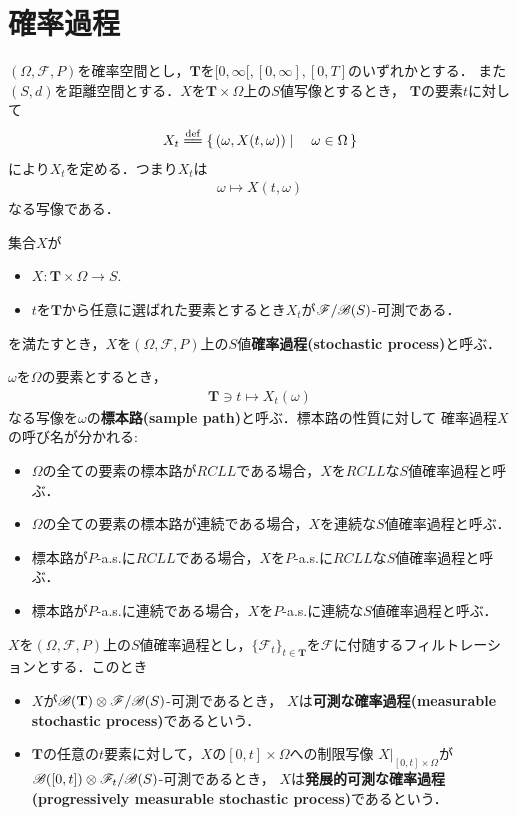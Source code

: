 \section{確率過程}
	$(\Omega,\mathscr{F},P)$を確率空間とし，$\mathbf{T}$を$[0,\infty[,[0,\infty],[0,T]$のいずれかとする．
	また$(S,d)$を距離空間とする．$X$を$\mathbf{T} \times \Omega$上の$S$値写像とするとき，
	$\mathbf{T}$の要素$t$に対して
	\begin{align}
		X_t \defeq \Set{(\omega,X(t,\omega))}{\omega \in \Omega}
	\end{align}
	により$X_t$を定める．つまり$X_t$は
	\begin{align}
		\omega \longmapsto X(t,\omega)
	\end{align}
	なる写像である．
	
	\begin{screen}
		\begin{dfn}[確率過程]
			集合$X$が
			\begin{itemize}
				\item $X:\mathbf{T} \times \Omega \longrightarrow S$.
				\item $t$を$\mathbf{T}$から任意に選ばれた要素とするとき$X_t$が$\mathscr{F}/\mathscr{B}(S)$-可測である．
			\end{itemize}
			を満たすとき，$X$を$(\Omega,\mathscr{F},P)$上の$S$値{\bf 確率過程}{\bf (stochastic process)}と呼ぶ．
		\end{dfn}
	\end{screen}
	
	$\omega$を$\Omega$の要素とするとき，
	\begin{align}
		\mathbf{T} \ni t \longmapsto X_t(\omega)
	\end{align}
	なる写像を$\omega$の{\bf 標本路}{\bf (sample path)}と呼ぶ．標本路の性質に対して
	確率過程$X$の呼び名が分かれる:
	\begin{itemize}
		\item $\Omega$の全ての要素の標本路が$RCLL$である場合，$X$を$RCLL$な$S$値確率過程と呼ぶ．
		\item $\Omega$の全ての要素の標本路が連続である場合，$X$を連続な$S$値確率過程と呼ぶ．
		\item 標本路が$P$-a.s.に$RCLL$である場合，$X$を$P$-a.s.に$RCLL$な$S$値確率過程と呼ぶ．
		\item 標本路が$P$-a.s.に連続である場合，$X$を$P$-a.s.に連続な$S$値確率過程と呼ぶ．
	\end{itemize}
	
	$X$を$(\Omega,\mathscr{F},P)$上の$S$値確率過程とし，$\{\mathscr{F}_t\}_{t \in \mathbf{T}}$を$\mathscr{F}$に付随するフィルトレーションとする．このとき
	\begin{itemize}
		\item $X$が$\mathscr{B}(\mathbf{T}) \otimes \mathscr{F}/\mathscr{B}(S)$-可測であるとき，
			$X$は{\bf 可測な確率過程}{\bf (measurable stochastic process)}であるという．
		\item $\mathbf{T}$の任意の$t$要素に対して，$X$の$[0,t] \times \Omega$への制限写像
			$X|_{[0,t] \times \Omega}$が$\mathscr{B}([0,t]) \otimes \mathscr{F}_t/\mathscr{B}(S)$-可測であるとき，
			$X$は{\bf 発展的可測な確率過程}{\bf (progressively measurable stochastic process)}であるという．
	\end{itemize}
	
